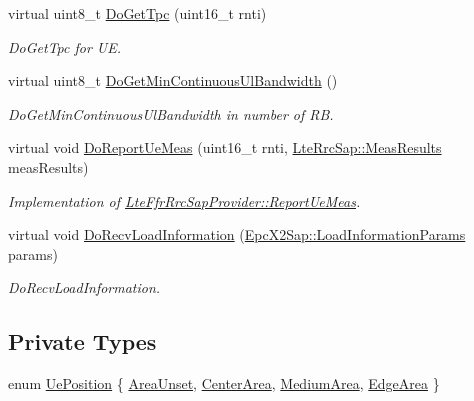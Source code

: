 \begin{DoxyCompactItemize}
virtual uint8\+\_\+t \hyperlink{classns3_1_1LteFfrSoftAlgorithm_a13961dbe9c385a621ab3057dee914312}{Do\+Get\+Tpc} (uint16\+\_\+t rnti)
\begin{DoxyCompactList}\small\item\em Do\+Get\+Tpc for UE. \end{DoxyCompactList}\item 
virtual uint8\+\_\+t \hyperlink{classns3_1_1LteFfrSoftAlgorithm_abd14b9f80e76b25cf1c927e16287235e}{Do\+Get\+Min\+Continuous\+Ul\+Bandwidth} ()
\begin{DoxyCompactList}\small\item\em Do\+Get\+Min\+Continuous\+Ul\+Bandwidth in number of RB. \end{DoxyCompactList}\item 
virtual void \hyperlink{classns3_1_1LteFfrSoftAlgorithm_a81d3715fb7a7a8fe3ba4dc9770d17a70}{Do\+Report\+Ue\+Meas} (uint16\+\_\+t rnti, \hyperlink{structns3_1_1LteRrcSap_1_1MeasResults}{Lte\+Rrc\+Sap\+::\+Meas\+Results} meas\+Results)
\begin{DoxyCompactList}\small\item\em Implementation of \hyperlink{classns3_1_1LteFfrRrcSapProvider_aefa0779641b8432a7d3406b519ca7e59}{Lte\+Ffr\+Rrc\+Sap\+Provider\+::\+Report\+Ue\+Meas}. \end{DoxyCompactList}\item 
virtual void \hyperlink{classns3_1_1LteFfrSoftAlgorithm_a6f1c0c4ae361f3108291cdab26f61d4f}{Do\+Recv\+Load\+Information} (\hyperlink{structns3_1_1EpcX2Sap_1_1LoadInformationParams}{Epc\+X2\+Sap\+::\+Load\+Information\+Params} params)
\begin{DoxyCompactList}\small\item\em Do\+Recv\+Load\+Information. \end{DoxyCompactList}\end{DoxyCompactItemize}
\subsection*{Private Types}
\begin{DoxyCompactItemize}
\item 
enum \hyperlink{classns3_1_1LteFfrSoftAlgorithm_ab7465e8060d14e4f9e298b06c9ba372c}{Ue\+Position} \{ \hyperlink{classns3_1_1LteFfrSoftAlgorithm_ab7465e8060d14e4f9e298b06c9ba372ca97ba8e00159d25b2bfc08bf2fd5926c8}{Area\+Unset}, 
\hyperlink{classns3_1_1LteFfrSoftAlgorithm_ab7465e8060d14e4f9e298b06c9ba372ca6b2efef259a1214094469a40ee394d9d}{Center\+Area}, 
\hyperlink{classns3_1_1LteFfrSoftAlgorithm_ab7465e8060d14e4f9e298b06c9ba372ca72dc112f24d8d2424039109b8d3e71a6}{Medium\+Area}, 
\hyperlink{classns3_1_1LteFfrSoftAlgorithm_ab7465e8060d14e4f9e298b06c9ba372caf9e9c75f49991f8ac90d74756884c9f5}{Edge\+Area}
 \}
\end{DoxyCompactItemize}
